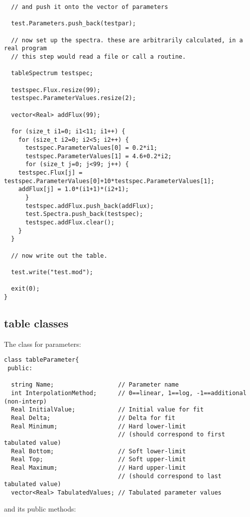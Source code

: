 \documentclass[11pt]{book}
\begin{document}
\begin{verbatim}
  // and push it onto the vector of parameters

  test.Parameters.push_back(testpar);

  // now set up the spectra. these are arbitrarily calculated, in a real program 
  // this step would read a file or call a routine.

  tableSpectrum testspec;

  testspec.Flux.resize(99);
  testspec.ParameterValues.resize(2);

  vector<Real> addFlux(99);

  for (size_t i1=0; i1<11; i1++) {
    for (size_t i2=0; i2<5; i2++) {
      testspec.ParameterValues[0] = 0.2*i1;
      testspec.ParameterValues[1] = 4.6+0.2*i2;
      for (size_t j=0; j<99; j++) {
	testspec.Flux[j] = testspec.ParameterValues[0]+10*testspec.ParameterValues[1];
	addFlux[j] = 1.0*(i1+1)*(i2+1);
      }
      testspec.addFlux.push_back(addFlux);
      test.Spectra.push_back(testspec);
      testspec.addFlux.clear();
    }
  }

  // now write out the table.

  test.write("test.mod");

  exit(0);
}
\end{verbatim}


\subsection{table classes}

The class for parameters:

\begin{verbatim}
class tableParameter{
 public:

  string Name;                  // Parameter name
  int InterpolationMethod;      // 0==linear, 1==log, -1==additional (non-interp)
  Real InitialValue;            // Initial value for fit
  Real Delta;                   // Delta for fit
  Real Minimum;                 // Hard lower-limit 
                                // (should correspond to first tabulated value)
  Real Bottom;                  // Soft lower-limit
  Real Top;                     // Soft upper-limit
  Real Maximum;                 // Hard upper-limit 
                                // (should correspond to last tabulated value)
  vector<Real> TabulatedValues; // Tabulated parameter values
\end{verbatim}

and its public methods:
\end{document}
